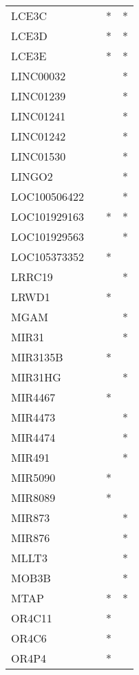 \begin{longtable}{lccc}
LCE3C        &       &  * &       * \\
LCE3D        &       &  * &       * \\
LCE3E        &       &  * &       * \\
LINC00032    &       &    &       * \\
LINC01239    &       &    &       * \\
LINC01241    &       &    &       * \\
LINC01242    &       &    &       * \\
LINC01530    &       &    &       * \\
LINGO2       &       &    &       * \\
LOC100506422 &       &    &       * \\
LOC101929163 &       &  * &       * \\
LOC101929563 &       &    &       * \\
LOC105373352 &       &  * &         \\
LRRC19       &       &    &       * \\
LRWD1        &       &  * &         \\
MGAM         &       &    &       * \\
MIR31        &       &    &       * \\
MIR3135B     &       &  * &         \\
MIR31HG      &       &    &       * \\
MIR4467      &       &  * &         \\
MIR4473      &       &    &       * \\
MIR4474      &       &    &       * \\
MIR491       &       &    &       * \\
MIR5090      &       &  * &         \\
MIR8089      &       &  * &         \\
MIR873       &       &    &       * \\
MIR876       &       &    &       * \\
MLLT3        &       &    &       * \\
MOB3B        &       &    &       * \\
MTAP         &       &  * &       * \\
OR4C11       &       &  * &         \\
OR4C6        &       &  * &         \\
OR4P4        &       &  * &         \\

\end{longtable}
